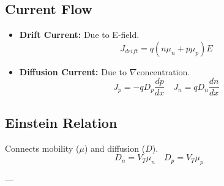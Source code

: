 \documentclass[10pt]{article}
\begin{document}
\begin{multicols}{3}
\subsection*{Current Flow}
\begin{itemize}\itemsep0pt
    \item \textbf{Drift Current:} Due to E-field.
    \[ J_{drift} = q(n\mu_n + p\mu_p)E \]
    \item \textbf{Diffusion Current:} Due to $\nabla$concentration.
    \[ J_p = -qD_p \frac{dp}{dx} \quad J_n = qD_n \frac{dn}{dx} \]
\end{itemize}

\subsection*{Einstein Relation}
Connects mobility ($\mu$) and diffusion ($D$).
\[ D_n = V_T \mu_n \quad D_p = V_T \mu_p \]

\end{multicols}

--- %
\end{document}
